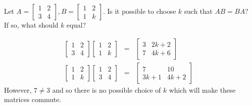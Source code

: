 \documentclass{ximera}
\begin{document}
\begin{problem}\label{prb:4.15} Let $A=\left[
\begin{array}{rr}
1 & 2 \\
3 & 4
\end{array}
\right] ,B=\left[
\begin{array}{rr}
1 & 2 \\
1 & k
\end{array}
\right] .$ Is it possible to choose $k$ such that $AB=BA?$ If so, what
should $k$ equal?
\begin{hint}
\begin{eqnarray*}
\left[
\begin{array}{cc}
1 & 2 \\
3 & 4
\end{array}
\right] \left[
\begin{array}{cc}
1 & 2 \\
1 & k
\end{array}
\right] &=& \left[
\begin{array}{cc}
3 & 2k+2 \\
7 & 4k+6
\end{array}
\right] \\
\left[
\begin{array}{cc}
1 & 2 \\
1 & k
\end{array}
\right] \left[
\begin{array}{cc}
1 & 2 \\
3 & 4
\end{array}
\right] &=& \left[
\begin{array}{cc}
7 & 10 \\
3k+1 & 4k+2
\end{array}
\right]
\end{eqnarray*}
 However, $7\neq 3$ and so there is no possible choice of $k$ which
will make these matrices commute.
\end{hint}
\end{problem}
\end{document}
